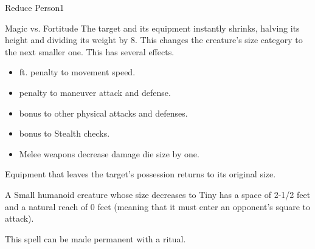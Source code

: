 \begin{spellsection}{Reduce Person}{1}
    \begin{spellheader}
    \end{spellheader}
    \begin{spellcontent}
        \begin{spelltargetinginfo}
        \end{spelltargetinginfo}
        \begin{spelleffects}
            \begin{spellattack}{Magic vs. Fortitude}
                \spellsuccess The target and its equipment instantly shrinks, halving its height and dividing its weight by 8. This changes the creature's size category to the next smaller one. This has several effects.
                \begin{itemize} 
                    \item {} ft. penalty to movement speed.
                    \item {} penalty to maneuver attack and defense.
                    \item {} bonus to other physical attacks and defenses.
                    \item {} bonus to Stealth checks.
                    \item Melee weapons decrease damage die size by one.
                \end{itemize}
                \par Equipment that leaves the target's possession returns to its original size.
            \end{spellattack}
            \spelldur \durshort \dismissable
        \end{spelleffects}
    \end{spellcontent}
    \begin{spellfooter}
        \spellnotes A Small humanoid creature whose size decreases to Tiny has a space of 2-1/2 feet and a natural reach of 0 feet (meaning that it must enter an opponent's square to attack).

        \sizingspellnotes This spell can be made permanent with a  ritual.
        \miscastrandom
    \end{spellfooter}
\end{spellsection}

